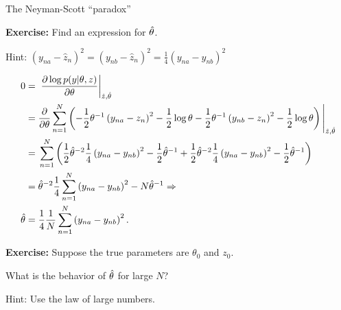\begin{frame}{The Neyman-Scott ``paradox''}

\textbf{Exercise:} Find an expression for $\hat\theta$.

Hint:
%
$%
\left( y_{na}  - \hat{z}_n\right)^2 =
\left( y_{nb}  - \hat{z}_n\right)^2 =
\frac{1}{4} \left( y_{na}  - y_{nb}\right)^2
%
$
%

\begin{align*}
%
0 ={}& \fracat{\partial \log p(y | \theta, z)}{\partial \theta}{\hat{z}, \thetahat} \\
={}& \frac{\partial}{\partial \theta}
\sumn
\left(
-\frac{1}{2} \theta^{-1} \left( y_{na}  - z_n\right)^2 - \frac{1}{2}\log \theta
-\frac{1}{2} \theta^{-1} \left( y_{nb}  - z_n\right)^2 - \frac{1}{2}\log \theta
\right)
\Bigg|_{\hat{z}, \thetahat}\\
={}&
\sumn
\left(
\frac{1}{2} \thetahat^{-2} \frac{1}{4} \left( y_{na}  - y_{nb}\right)^2 - \frac{1}{2}\thetahat^{-1} +
\frac{1}{2} \thetahat^{-2} \frac{1}{4} \left( y_{na}  - y_{nb}\right)^2 - \frac{1}{2}\thetahat^{-1}
\right)
\\={}&
\thetahat^{-2} \frac{1}{4} \sumn \left( y_{na}  - y_{nb}\right)^2 - N \thetahat^{-1}
\Rightarrow \\
\thetahat ={}& \frac{1}{4} \meann \left( y_{na}  - y_{nb}\right)^2.
%
\end{align*}

\textbf{Exercise:}
Suppose the true parameters are $\theta_0$ and $z_0$.

What is the behavior of $\hat\theta$ for large $N$?

Hint: Use the law of large numbers.

\end{frame}




